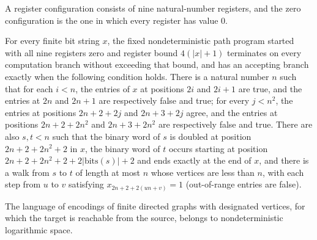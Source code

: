 \begin{definition}
\label{Complexity.LogProg.PReg.zero}
\leanok
{}
A register configuration consists of nine natural-number registers, and the zero
configuration is the one in which every register has value $0$.
\end{definition}

\begin{theorem}
\label{Complexity.LogProg.ps_start}
\leanok
{}
For every finite bit string $x$, the fixed nondeterministic path program started with
all nine registers zero and register bound $4(|x|+1)$ terminates on every computation
branch without exceeding that bound, and has an accepting branch exactly when the
following condition holds. There is a natural number $n$ such that for each $i<n$, the
entries of $x$ at positions $2i$ and $2i+1$ are true, and the entries at $2n$ and $2n+1$
are respectively false and true; for every $j<n^2$, the entries at positions $2n+2+2j$
and $2n+3+2j$ agree, and the entries at positions $2n+2+2n^2$ and $2n+3+2n^2$ are
respectively false and true. There are also $s,t<n$ such that the binary word of $s$ is
doubled at position $2n+2+2n^2+2$ in $x$, the binary word of $t$ occurs starting at
position $2n+2+2n^2+2+2|\mathrm{bits}(s)|+2$ and ends exactly at the end of $x$, and
there is a walk from $s$ to $t$ of length at most $n$ whose vertices are less than $n$,
with each step from $u$ to $v$ satisfying $x_{2n+2+2(un+v)}=1$ (out-of-range entries are
false).
\end{theorem}

\begin{theorem}
\label{Complexity.pathRawLang_mem_NL}
\leanok
{}
The language of encodings of finite directed graphs with designated vertices, for which
the target is reachable from the source, belongs to nondeterministic logarithmic space.
\end{theorem}
